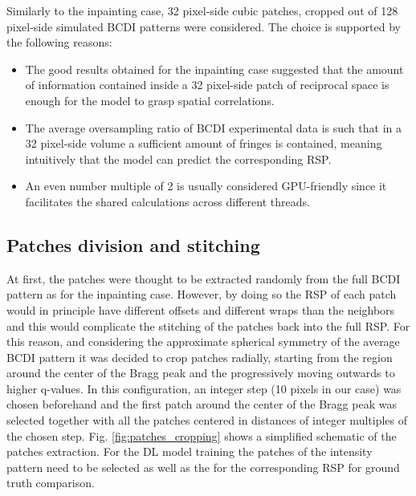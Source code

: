 Similarly to the inpainting case, 32 pixel-side cubic patches, cropped out of 128 pixel-side simulated
BCDI patterns were considered. The choice is supported by the following reasons: 

\begin{itemize}
    \item The good results obtained for the inpainting case suggested that the amount of information contained inside a
    32 pixel-side patch of reciprocal space is enough for the model to grasp spatial correlations.  
    \item The average oversampling ratio of BCDI experimental data is such that in a 32 pixel-side volume a sufficient
    amount of fringes is contained, meaning intuitively that the model can predict the corresponding RSP. 
    \item An even number multiple of 2 is usually considered GPU-friendly since it facilitates the shared calculations across
    different threads. 
\end{itemize}

\subsection{Patches division and stitching}\label{sbsec:patches_creation}
At first, the patches were thought to be extracted randomly from the full BCDI pattern as for the inpainting case. 
However, by doing so the RSP of each patch would in principle have different offsets and different wraps than the neighbors 
and this would complicate the stitching of the patches back into the full RSP. 
For this reason, and considering the approximate spherical symmetry of the average BCDI pattern it was decided to crop patches radially, 
starting from the region around the center of the Bragg peak and the progressively moving outwards to higher q-values. 
In this configuration, an integer step (10 pixels in our case) was chosen beforehand and the first patch around the center 
of the Bragg peak was selected together with all the patches centered in distances of integer multiples of the chosen step. 
Fig. \ref{fig:patches_cropping} shows a simplified schematic of the patches extraction. 
For the DL model training the patches of the intensity pattern need to be selected as well as the for the corresponding 
RSP for ground truth comparison. 


